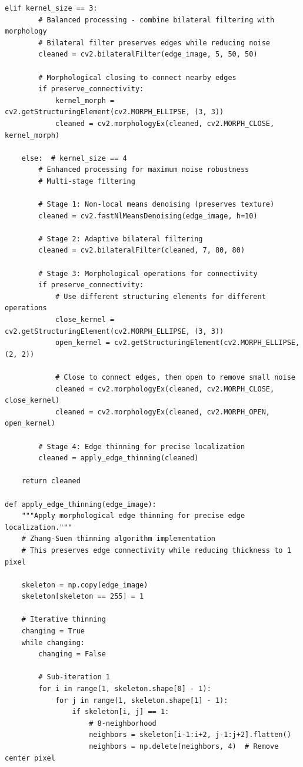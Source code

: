 \documentclass[conference]{IEEEtran}
\begin{document}
{{{{{{{{{{\begin{lstlisting}[caption={Multi-scale noise reduction with edge preservation}]
    elif kernel_size == 3:
        # Balanced processing - combine bilateral filtering with morphology
        # Bilateral filter preserves edges while reducing noise
        cleaned = cv2.bilateralFilter(edge_image, 5, 50, 50)
        
        # Morphological closing to connect nearby edges
        if preserve_connectivity:
            kernel_morph = cv2.getStructuringElement(cv2.MORPH_ELLIPSE, (3, 3))
            cleaned = cv2.morphologyEx(cleaned, cv2.MORPH_CLOSE, kernel_morph)
        
    else:  # kernel_size == 4
        # Enhanced processing for maximum noise robustness
        # Multi-stage filtering
        
        # Stage 1: Non-local means denoising (preserves texture)
        cleaned = cv2.fastNlMeansDenoising(edge_image, h=10)
        
        # Stage 2: Adaptive bilateral filtering
        cleaned = cv2.bilateralFilter(cleaned, 7, 80, 80)
        
        # Stage 3: Morphological operations for connectivity
        if preserve_connectivity:
            # Use different structuring elements for different operations
            close_kernel = cv2.getStructuringElement(cv2.MORPH_ELLIPSE, (3, 3))
            open_kernel = cv2.getStructuringElement(cv2.MORPH_ELLIPSE, (2, 2))
            
            # Close to connect edges, then open to remove small noise
            cleaned = cv2.morphologyEx(cleaned, cv2.MORPH_CLOSE, close_kernel)
            cleaned = cv2.morphologyEx(cleaned, cv2.MORPH_OPEN, open_kernel)
        
        # Stage 4: Edge thinning for precise localization
        cleaned = apply_edge_thinning(cleaned)
    
    return cleaned

def apply_edge_thinning(edge_image):
    """Apply morphological edge thinning for precise edge localization."""
    # Zhang-Suen thinning algorithm implementation
    # This preserves edge connectivity while reducing thickness to 1 pixel
    
    skeleton = np.copy(edge_image)
    skeleton[skeleton == 255] = 1
    
    # Iterative thinning
    changing = True
    while changing:
        changing = False
        
        # Sub-iteration 1
        for i in range(1, skeleton.shape[0] - 1):
            for j in range(1, skeleton.shape[1] - 1):
                if skeleton[i, j] == 1:
                    # 8-neighborhood
                    neighbors = skeleton[i-1:i+2, j-1:j+2].flatten()
                    neighbors = np.delete(neighbors, 4)  # Remove center pixel
                    

\end{lstlisting}}}}}}}}}}}
\end{document}
